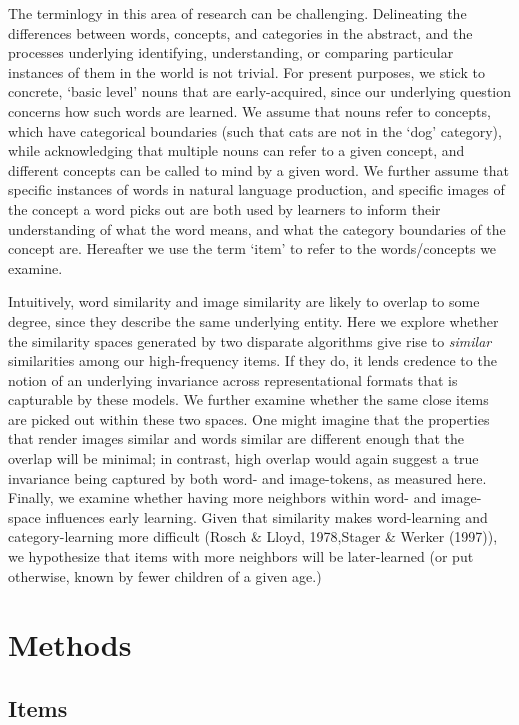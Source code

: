 \documentclass[10pt, letterpaper]{article}
\begin{document}
The terminlogy in this area of research can be challenging. Delineating
the differences between words, concepts, and categories in the abstract,
and the processes underlying identifying, understanding, or comparing
particular instances of them in the world is not trivial. For present
purposes, we stick to concrete, `basic level' nouns that are
early-acquired, since our underlying question concerns how such words
are learned. We assume that nouns refer to concepts, which have
categorical boundaries (such that cats are not in the `dog' category),
while acknowledging that multiple nouns can refer to a given concept,
and different concepts can be called to mind by a given word. We further
assume that specific instances of words in natural language production,
and specific images of the concept a word picks out are both used by
learners to inform their understanding of what the word means, and what
the category boundaries of the concept are. Hereafter we use the term
`item' to refer to the words/concepts we examine.

Intuitively, word similarity and image similarity are likely to overlap
to some degree, since they describe the same underlying entity. Here we
explore whether the similarity spaces generated by two disparate
algorithms give rise to \emph{similar} similarities among our
high-frequency items. If they do, it lends credence to the notion of an
underlying invariance across representational formats that is capturable
by these models. We further examine whether the same close items are
picked out within these two spaces. One might imagine that the
properties that render images similar and words similar are different
enough that the overlap will be minimal; in contrast, high overlap would
again suggest a true invariance being captured by both word- and
image-tokens, as measured here. Finally, we examine whether having more
neighbors within word- and image-space influences early learning. Given
that similarity makes word-learning and category-learning more difficult
(Rosch \& Lloyd, 1978,Stager \& Werker (1997)), we hypothesize that
items with more neighbors will be later-learned (or put otherwise, known
by fewer children of a given age.)

\section{Methods}\label{methods}

\subsection{Items}\label{items}
\end{document}
